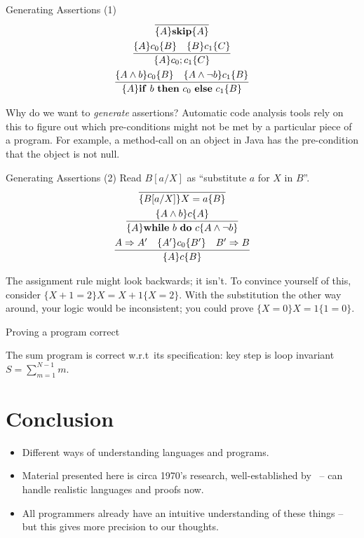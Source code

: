 \begin{frame}{Generating Assertions (1)}
    \begin{gather*}
        \infer{\{A\}\mathbf{skip}\{A\}}{} \\
        \infer{\{A\}c_0; c_1\{C\}}{\{A\}c_0\{B\} \quad \{B\}c_1\{C\}} \\
        \infer{\{A\}\mathbf{if}\ b\ \mathbf{then}\ c_0\ \mathbf{else}\ c_1\{B\}}{\{A \wedge b\}c_0\{B\} \quad \{A \wedge \neg b\}c_1\{B\}}
    \end{gather*}
\end{frame}

Why do we want to \emph{generate} assertions? Automatic code analysis tools
rely on this to figure out which pre-conditions might not be met by a
particular piece of a program. For example, a method-call on an object in
Java has the pre-condition that the object is not null.

\begin{frame}{Generating Assertions (2)}
    Read $B[a/X]$ as ``substitute $a$ for $X$ in $B$''.
    \begin{gather*}
        \infer{\{B[a/X]\}X = a\{B\}}{} \\
        \infer{\{A\}\mathbf{while}\ b\ \mathbf{do}\ c\{A \wedge \neg b\}}{\{A \wedge b\}c\{A\}} \\
        \infer{\{A\}c\{B\}}{A \Rightarrow A' \quad \{A'\}c_0\{B'\} \quad B' \Rightarrow B}
    \end{gather*}
\end{frame}

The assignment rule might look backwards; it isn't. To convince yourself of
this, consider $\{X + 1 = 2\} X = X + 1 \{X = 2\}$. With the substitution the
other way around, your logic would be inconsistent; you could prove $\{X = 0\}
X = 1 \{ 1 = 0 \}$.

\begin{frame}{Proving a program correct}
    \begin{theorem}
        The sum program is correct w.r.t~its specification: key step is loop invariant
        $S = \sum_{m=1}^{N-1}m$.
    \end{theorem}
\end{frame}


\section{Conclusion}

\begin{frame}
    \begin{itemize}[<+->]
        \item Different ways of understanding languages and programs.
        \item Material presented here is circa 1970's research,
        well-established by~\citet{winskel1993formal} -- can handle
        realistic languages and proofs now.
        \item All programmers already have an intuitive understanding of these
            things -- but this gives more precision to our thoughts.
    \end{itemize}
\end{frame}

